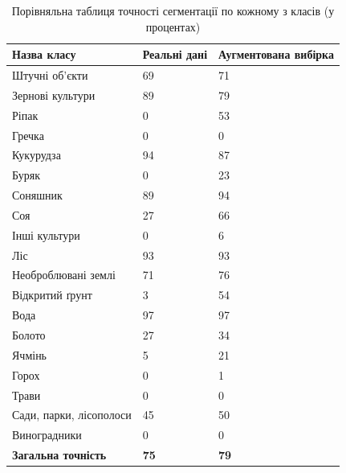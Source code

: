\documentclass{ConfFTI}
\begin{document}
\begin{table}[ht]
	\centering
	\caption{Порівняльна таблиця точності сегментації по кожному з класів (у процентах)}
	\begin{tabular}{|M{2.5cm}|M{2.5cm}|M{2.5cm}|}
		\hline
		\textbf{Назва класу}              & \textbf{Реальні дані} & \textbf{Аугментована вибірка} \\
		\hline Штучні об'єкти             & 69                    & 71                            \\
		\hline Зернові культури           & 89                    & 79                            \\
		\hline Ріпак                      & 0                     & 53                            \\
		\hline Гречка                     & 0                     & 0                             \\
		\hline Кукурудза                  & 94                    & 87                            \\
		\hline Буряк                      & 0                     & 23                            \\
		\hline Соняшник                   & 89                    & 94                            \\
		\hline Соя                        & 27                    & 66                            \\
		\hline Інші культури              & 0                     & 6                             \\
		\hline Ліс                        & 93                    & 93                            \\
		\hline Необроблювані землі        & 71                    & 76                            \\
		\hline Відкритий ґрунт            & 3                     & 54                            \\
		\hline Вода                       & 97                    & 97                            \\
		\hline Болото                     & 27                    & 34                            \\
		\hline Ячмінь                     & 5                     & 21                            \\
		\hline Горох                      & 0                     & 1                             \\
		\hline Трави                      & 0                     & 0                             \\
		\hline Сади, парки, лісополоси    & 45                    & 50                            \\
		\hline Виноградники               & 0                     & 0                             \\
		\hline \textbf{Загальна точність} & \textbf{75}           & \textbf{79}                   \\
		\hline
	\end{tabular}
	\label{tab:augm_compare}
\end{table}
\end{document}
